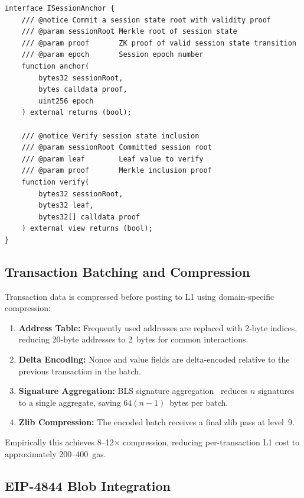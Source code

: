 \documentclass[11pt,a4paper]{article}
\begin{document}
\begin{lstlisting}[language=Solidity,caption={Session Anchor Interface}]
interface ISessionAnchor {
    /// @notice Commit a session state root with validity proof
    /// @param sessionRoot Merkle root of session state
    /// @param proof       ZK proof of valid session state transition
    /// @param epoch       Session epoch number
    function anchor(
        bytes32 sessionRoot,
        bytes calldata proof,
        uint256 epoch
    ) external returns (bool);

    /// @notice Verify session state inclusion
    /// @param sessionRoot Committed session root
    /// @param leaf        Leaf value to verify
    /// @param proof       Merkle inclusion proof
    function verify(
        bytes32 sessionRoot,
        bytes32 leaf,
        bytes32[] calldata proof
    ) external view returns (bool);
}
\end{lstlisting}

\subsection{Transaction Batching and Compression}

Transaction data is compressed before posting to L1 using domain-specific
compression:

\begin{enumerate}
    \item \textbf{Address Table:} Frequently used addresses are replaced
    with 2-byte indices, reducing 20-byte addresses to 2~bytes for common
    interactions.

    \item \textbf{Delta Encoding:} Nonce and value fields are delta-encoded
    relative to the previous transaction in the batch.

    \item \textbf{Signature Aggregation:} BLS signature
    aggregation~\cite{boneh2001bls} reduces $n$ signatures to a single
    aggregate, saving $64(n-1)$~bytes per batch.

    \item \textbf{Zlib Compression:} The encoded batch receives a final
    zlib pass at level~9.
\end{enumerate}

Empirically this achieves 8--12$\times$ compression, reducing per-transaction
L1 cost to approximately 200--400~gas.

\subsection{EIP-4844 Blob Integration}
\end{document}
